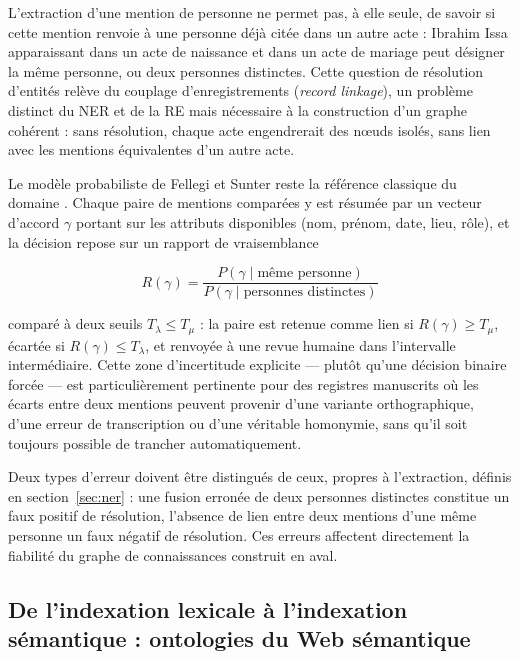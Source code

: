 L'extraction d'une mention de personne ne permet pas, à elle seule, de savoir si cette mention renvoie à une personne déjà citée dans un autre acte : \og Ibrahim Issa \fg{} apparaissant dans un acte de naissance et dans un acte de mariage peut désigner la même personne, ou deux personnes distinctes.
Cette question de résolution d'entités relève du couplage d'enregistrements (\textit{record linkage}), un problème distinct du NER et de la RE mais nécessaire à la construction d'un graphe cohérent : sans résolution, chaque acte engendrerait des nœuds isolés, sans lien avec les mentions équivalentes d'un autre acte.

Le modèle probabiliste de Fellegi et Sunter reste la référence classique du domaine \cite{fellegiSunter1969}. Chaque paire de mentions comparées y est résumée par un vecteur d'accord $\gamma$ portant sur les attributs disponibles (nom, prénom, date, lieu, rôle), et la décision repose sur un rapport de vraisemblance

\begin{equation}
    R(\gamma) = \frac{P(\gamma \mid \text{même personne})}{P(\gamma \mid \text{personnes distinctes})}
\end{equation}

comparé à deux seuils $T_\lambda \leq T_\mu$ : la paire est retenue comme lien si $R(\gamma) \geq T_\mu$, écartée si $R(\gamma) \leq T_\lambda$, et renvoyée à une revue humaine dans l'intervalle intermédiaire.
Cette zone d'incertitude explicite --- plutôt qu'une décision binaire forcée --- est particulièrement pertinente pour des registres manuscrits où les écarts entre deux mentions peuvent provenir d'une variante orthographique, d'une erreur de transcription ou d'une véritable homonymie, sans qu'il soit toujours possible de trancher automatiquement.

Deux types d'erreur doivent être distingués de ceux, propres à l'extraction, définis en section~\ref{sec:ner} : une fusion erronée de deux personnes distinctes constitue un faux positif de résolution, l'absence de lien entre deux mentions d'une même personne un faux négatif de résolution. Ces erreurs affectent directement la fiabilité du graphe de connaissances construit en aval.

\subsection{De l'indexation lexicale à l'indexation sémantique : ontologies du Web sémantique}
\label{sec:indexation-lexicale-semantique}

